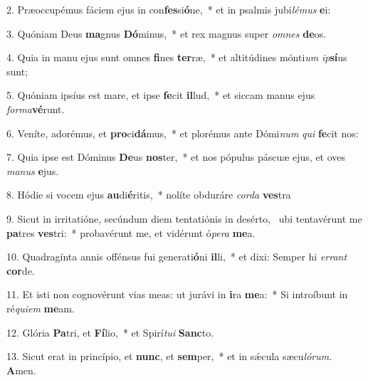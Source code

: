 2. Præoccupémus fáciem ejus in con\textbf{fes}si\textbf{ó}ne,~*  et in psalmis jubi\textit{lé}\textit{mus} \textbf{e}i:\

3. Quóniam Deus \textbf{ma}gnus \textbf{Dó}minus,~*  et rex magnus super \textit{om}\textit{nes} \textbf{de}os.\

4. Quia in manu ejus sunt omnes \textbf{fi}nes \textbf{ter}ræ,~*  et altitúdines mónti\textit{um} \textit{ip}\textbf{sí}us sunt;\

5. Quóniam ipsíus est mare, et ipse \textbf{fe}cit \textbf{il}lud,~*  et siccam manus ejus \textit{for}\textit{ma}\textbf{vé}runt.\

6. Veníte, adorémus, et \textbf{pro}ci\textbf{dá}mus,~*  et plorémus ante Dómi\textit{num} \textit{qui} \textbf{fe}cit nos:\

7. Quia ipse est Dóminus \textbf{De}us \textbf{nos}ter,~*  et nos pópulus páscuæ ejus, et oves \textit{ma}\textit{nus} \textbf{e}jus.\

8. Hódie si vocem ejus \textbf{au}di\textbf{é}ritis,~*  nolíte obduráre \textit{cor}\textit{da} \textbf{ves}tra\

9. Sicut in irritatióne, secúndum diem tentatiónis in desérto, \dag\  ubi tentavérunt me \textbf{pa}tres \textbf{ves}tri:~*  probavérunt me, et vidérunt ó\textit{pe}\textit{ra} \textbf{me}a.\

10. Quadragínta annis offénsus fui generati\textbf{ó}ni \textbf{il}li,~*  et dixi: Semper hi \textit{er}\textit{rant} \textbf{cor}de.\

11. Et isti non cognovérunt vias meas: ut jurávi in \textbf{i}ra \textbf{me}a:~*  Si introíbunt in ré\textit{qui}\textit{em} \textbf{me}am.\

12. Glória \textbf{Pa}tri, et \textbf{Fí}lio,~*  et Spirí\textit{tu}\textit{i} \textbf{Sanc}to.\

13. Sicut erat in princípio, et \textbf{nunc}, et \textbf{sem}per,~*  et in sǽcula sæcu\textit{ló}\textit{rum}. \textbf{A}men.\

